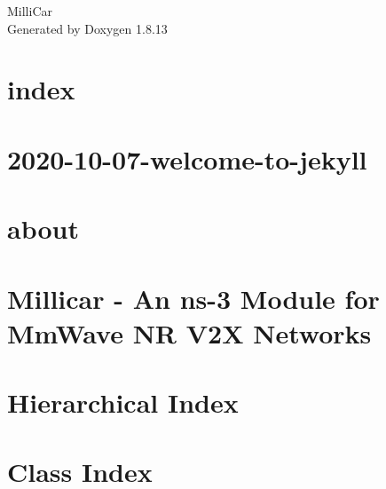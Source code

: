 \documentclass[twoside]{book}
\newcommand{\+}{\discretionary{\mbox{\scriptsize$\hookleftarrow$}}{}{}}
\newcommand{\clearemptydoublepage}{%
  \newpage{\pagestyle{empty}\cleardoublepage}%
}
\begin{document}
\hypersetup{pageanchor=false,
             bookmarksnumbered=true,
             pdfencoding=unicode
            }
\begin{titlepage}
\vspace*{7cm}
\begin{center}%
{\Large Milli\+Car }\\
\vspace*{1cm}
{\large Generated by Doxygen 1.8.13}\\
\end{center}
\end{titlepage}
\clearemptydoublepage
{}
\tableofcontents
\clearemptydoublepage
{}
\hypersetup{pageanchor=true}

\chapter{index}
\label{md_docs_index}

\chapter{2020-\/10-\/07-\/welcome-\/to-\/jekyll}
\label{md_docs_test__posts_2020-10-07-welcome-to-jekyll}

\chapter{about}
\label{md_docs_test_about}

\chapter{Millicar -\/ An ns-\/3 Module for Mm\+Wave NR V2X Networks}
\label{md_README}

\chapter{Hierarchical Index}

\chapter{Class Index}

\end{document}
